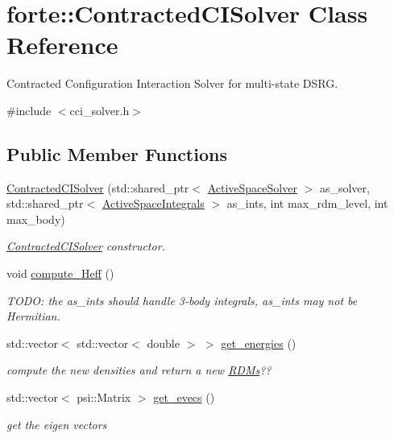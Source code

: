 \hypertarget{classforte_1_1_contracted_c_i_solver}{}\section{forte\+:\+:Contracted\+C\+I\+Solver Class Reference}
\label{classforte_1_1_contracted_c_i_solver}


Contracted Configuration Interaction Solver for multi-\/state D\+S\+RG.  




{\ttfamily \#include $<$cci\+\_\+solver.\+h$>$}

\subsection*{Public Member Functions}
\begin{DoxyCompactItemize}
\item 
\mbox{\hyperlink{classforte_1_1_contracted_c_i_solver_a4503df709ead99d98a03f5b04f6feeaa}{Contracted\+C\+I\+Solver}} (std\+::shared\+\_\+ptr$<$ \mbox{\hyperlink{classforte_1_1_active_space_solver}{Active\+Space\+Solver}} $>$ as\+\_\+solver, std\+::shared\+\_\+ptr$<$ \mbox{\hyperlink{classforte_1_1_active_space_integrals}{Active\+Space\+Integrals}} $>$ as\+\_\+ints, int max\+\_\+rdm\+\_\+level, int max\+\_\+body)
\begin{DoxyCompactList}\small\item\em \mbox{\hyperlink{classforte_1_1_contracted_c_i_solver}{Contracted\+C\+I\+Solver}} constructor. \end{DoxyCompactList}\item 
void \mbox{\hyperlink{classforte_1_1_contracted_c_i_solver_a048dbac796ce7a43a2e6021dbda14577}{compute\+\_\+\+Heff}} ()
\begin{DoxyCompactList}\small\item\em T\+O\+DO\+: the as\+\_\+ints should handle 3-\/body integrals, as\+\_\+ints may not be Hermitian. \end{DoxyCompactList}\item 
std\+::vector$<$ std\+::vector$<$ double $>$ $>$ \mbox{\hyperlink{classforte_1_1_contracted_c_i_solver_a06f7a3526d04daf00f8ec663b48f2d01}{get\+\_\+energies}} ()
\begin{DoxyCompactList}\small\item\em compute the new densities and return a new \mbox{\hyperlink{classforte_1_1_r_d_ms}{R\+D\+Ms}}?? \end{DoxyCompactList}\item 
std\+::vector$<$ psi\+::\+Matrix $>$ \mbox{\hyperlink{classforte_1_1_contracted_c_i_solver_ad3d7712cb2485dde8b3fbb9b8e47b657}{get\+\_\+evecs}} ()
\begin{DoxyCompactList}\small\item\em get the eigen vectors \end{DoxyCompactList}\end{DoxyCompactItemize}


